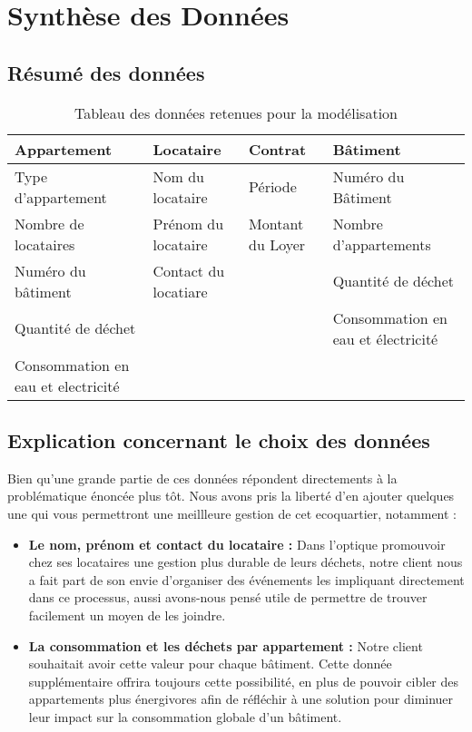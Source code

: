 \chapter{Synthèse des Données}

\section{Résumé des données}

\begin{table}[h]
\centering
\begin{tabularx}{\textwidth}{|X|X|X|X|}
\hline
\textbf{Appartement} & \textbf{Locataire} & \textbf{Contrat} & \textbf{Bâtiment}\\
\hline
Type d'appartement & Nom du locataire & Période & Numéro du Bâtiment \\
\hline
Nombre de locataires & Prénom du locataire & Montant du Loyer & Nombre d'appartements \\
\hline
Numéro du bâtiment & Contact du locatiare & & Quantité de déchet \\
\hline
Quantité de déchet & & & Consommation en eau et électricité \\
\hline
Consommation en eau et electricité & & & \\
\hline
\end{tabularx}
\caption{Tableau des données retenues pour la modélisation}
\end{table}

\section{Explication concernant le choix des données}

Bien qu'une grande partie de ces données répondent directements à la problématique énoncée plus tôt. Nous avons pris la liberté d'en ajouter quelques une qui vous permettront une meillleure gestion de cet ecoquartier, notamment :
\begin{itemize}
\item \textbf{Le nom, prénom et contact du locataire :} Dans l'optique promouvoir chez ses locataires une gestion plus durable de leurs déchets, notre client nous a fait part de son envie d'organiser des événements les impliquant directement dans ce processus, aussi avons-nous pensé utile de permettre de trouver facilement un moyen de les joindre.
\item \textbf{La consommation et les déchets par appartement :} Notre client souhaitait avoir cette valeur pour chaque bâtiment. Cette donnée supplémentaire offrira toujours cette possibilité, en plus de pouvoir cibler des appartements plus énergivores afin de réfléchir à une solution pour diminuer leur impact sur la consommation globale d'un bâtiment.
\end{itemize}

